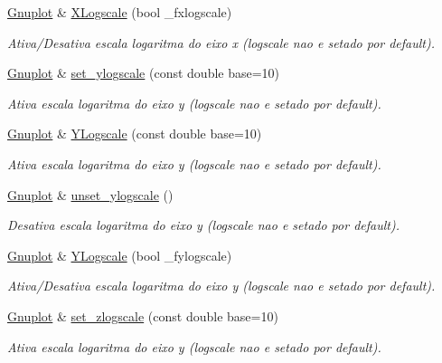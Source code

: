 \begin{DoxyCompactItemize}
\hyperlink{class_gnuplot}{Gnuplot} \& \hyperlink{class_gnuplot_abf7948557e91cb8c6eb6b641e1b55543}{X\+Logscale} (bool \+\_\+fxlogscale)
\begin{DoxyCompactList}\small\item\em Ativa/\+Desativa escala logaritma do eixo x (logscale nao e setado por default). \end{DoxyCompactList}\item 
\hyperlink{class_gnuplot}{Gnuplot} \& \hyperlink{class_gnuplot_a201a802d2f27fece0d39809c4eb3bce0}{set\+\_\+ylogscale} (const double base=10)
\begin{DoxyCompactList}\small\item\em Ativa escala logaritma do eixo y (logscale nao e setado por default). \end{DoxyCompactList}\item 
\hyperlink{class_gnuplot}{Gnuplot} \& \hyperlink{class_gnuplot_ab9b5e2985c658f7791d9a49dd7008bbf}{Y\+Logscale} (const double base=10)
\begin{DoxyCompactList}\small\item\em Ativa escala logaritma do eixo y (logscale nao e setado por default). \end{DoxyCompactList}\item 
\hyperlink{class_gnuplot}{Gnuplot} \& \hyperlink{class_gnuplot_a74ebc96273b30c98fb9c8f047dd34ac0}{unset\+\_\+ylogscale} ()
\begin{DoxyCompactList}\small\item\em Desativa escala logaritma do eixo y (logscale nao e setado por default). \end{DoxyCompactList}\item 
\hyperlink{class_gnuplot}{Gnuplot} \& \hyperlink{class_gnuplot_a6ab94815fbf0fabfa108cf659079828f}{Y\+Logscale} (bool \+\_\+fylogscale)
\begin{DoxyCompactList}\small\item\em Ativa/\+Desativa escala logaritma do eixo y (logscale nao e setado por default). \end{DoxyCompactList}\item 
\hyperlink{class_gnuplot}{Gnuplot} \& \hyperlink{class_gnuplot_a1da3838163b0dbde8809b55c5b5c56b1}{set\+\_\+zlogscale} (const double base=10)
\begin{DoxyCompactList}\small\item\em Ativa escala logaritma do eixo y (logscale nao e setado por default). \end{DoxyCompactList}\item 

\end{DoxyCompactItemize}
